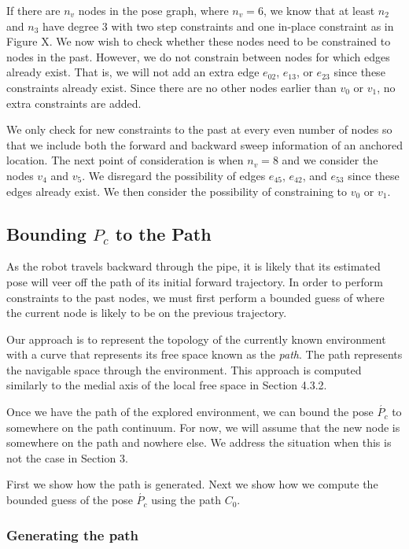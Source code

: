 If there are $n_v$ nodes in the pose graph, where $n_v = 6$, we know that at least $n_2$ and $n_3$ have degree $3$ with two step constraints and one in-place constraint as in Figure X.  We now wish to check whether these nodes need to be constrained to nodes in the past.  However, we do not constrain between nodes for which edges already exist.  That is, we will not add an extra edge $e_{02}$, $e_{13}$, or $e_{23}$ since these constraints already exist.  Since there are no other nodes earlier than $v_0$ or $v_1$, no extra constraints are added.

We only check for new constraints to the past at every even number of nodes so that we include both the forward and backward sweep information of an anchored location.  The next point of consideration is when $n_v = 8$ and we consider the nodes $v_4$ and $v_5$.  We disregard the possibility of edges $e_{45}$, $e_{42}$, and $e_{53}$ since these edges already exist.  We then consider the possibility of constraining to $v_0$ or $v_1$.

\subsection{Bounding $P_c$ to the Path}

As the robot travels backward through the pipe, it is likely that its estimated pose will veer off the path of its initial forward trajectory.  In order to perform constraints to the past nodes, we must first perform a bounded guess of where the current node is likely to be on the previous trajectory.

Our approach is to represent the topology of the currently known environment with a curve that represents its free space known as the \emph{path}.  The path represents the navigable space through the environment.  This approach is computed similarly to the medial axis of the local free space in Section 4.3.2.

Once we have the path of the explored environment, we can bound the pose $\acute{P_c}$ to somewhere on the path continuum.  For now, we will assume that the new node is somewhere on the path and nowhere else.  We address the situation when this is not the case in Section 3.

First we show how the path is generated.  Next we show how we compute the bounded guess of the pose $\acute{P_c}$ using the path $C_0$.

\subsubsection{Generating the path}

